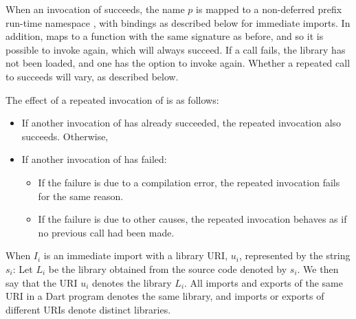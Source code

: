 \documentclass[makeidx]{article}
\begin{document}
{\LMHash{}%
When an invocation of  succeeds,
the name $p$ is mapped to a non-deferred prefix run-time namespace
,
with bindings as described below for immediate imports.
In addition, 
maps  to a function with the same signature as before,
and so it is possible to invoke  again,
which will always succeed.
If a call fails, the library has not been loaded,
and one has the option to invoke  again.
Whether a repeated call to  succeeds will vary,
as described below.


\LMHash{}%
The effect of a repeated invocation of  is as follows:
\begin{itemize}
\item
  If another invocation of  has already succeeded,
  the repeated invocation also succeeds.
  Otherwise,
\item
  If another invocation of  has failed:
  \begin{itemize}
  \item
    If the failure is due to a compilation error,
    the repeated invocation fails for the same reason.
  \item
    If the failure is due to other causes,
    the repeated invocation behaves as if no previous call had been made.
  \end{itemize}
\end{itemize}

\EndCase

\LMHash{}%
When $I_i$ is an immediate import with a library URI, $u_i$,
represented by the string $s_i$:
Let $L_i$ be the library obtained from the source code denoted by $s_i$.
We then say that the URI $u_i$ denotes the library $L_i$.
All imports and exports of the same URI in a Dart program denotes
the same library,
and imports or exports of different URIs denote distinct libraries.

}
\end{document}
